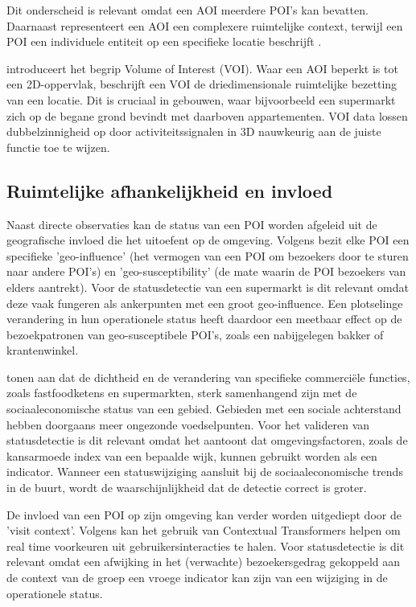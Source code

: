 Dit onderscheid is relevant omdat een AOI meerdere POI’s kan bevatten. Daarnaast representeert een AOI een complexere ruimtelijke context, terwijl een POI een individuele entiteit op een specifieke locatie beschrijft \autocite{Mai2018}.

\textcite{Storymaps2023} introduceert het begrip Volume of Interest (VOI). Waar een AOI beperkt is tot een 2D-oppervlak, beschrijft een VOI de driedimensionale ruimtelijke bezetting van een locatie. Dit is cruciaal in gebouwen, waar bijvoorbeeld een supermarkt zich op de begane grond bevindt met daarboven appartementen. VOI data lossen dubbelzinnigheid op door activiteitssignalen in 3D nauwkeurig aan de juiste functie toe te wijzen.

\subsection{Ruimtelijke afhankelijkheid en invloed}
\label{sec:Afhankelijkheid}

Naast directe observaties kan de status van een POI worden afgeleid uit de geografische invloed die het uitoefent op de omgeving. Volgens \textcite{Wang2018} bezit elke POI een specifieke 'geo-influence' (het vermogen van een POI om bezoekers door te sturen naar andere POI's) en 'geo-susceptibility' (de mate waarin de POI bezoekers van elders aantrekt). Voor de statusdetectie van een supermarkt is dit relevant omdat deze vaak fungeren als ankerpunten met een groot geo-influence. Een plotselinge verandering in hun operationele status heeft daardoor een meetbaar  effect op de bezoekpatronen van geo-susceptibele POI's, zoals een nabijgelegen bakker of krantenwinkel.

\textcite{Boskovic2026} tonen aan dat de dichtheid en de verandering van specifieke commerciële functies, zoals fastfoodketens en supermarkten, sterk samenhangend zijn met de sociaaleconomische status van een gebied. Gebieden met een sociale achterstand hebben doorgaans meer ongezonde voedselpunten. Voor het valideren van statusdetectie is dit relevant omdat het aantoont dat omgevingsfactoren, zoals de kansarmoede index van een bepaalde wijk, kunnen gebruikt worden als een indicator. Wanneer een statuswijziging aansluit bij de sociaaleconomische trends in de buurt, wordt de waarschijnlijkheid dat de detectie correct is groter.

De invloed van een POI op zijn omgeving kan verder worden uitgediept door de 'visit context'. Volgens \textcite{Pervin2025} kan het gebruik van Contextual Transformers helpen om real time voorkeuren uit gebruikersinteracties te halen. Voor statusdetectie is dit relevant omdat een afwijking in het (verwachte) bezoekersgedrag gekoppeld aan de context van de groep een vroege indicator kan zijn van een wijziging in de operationele status.

